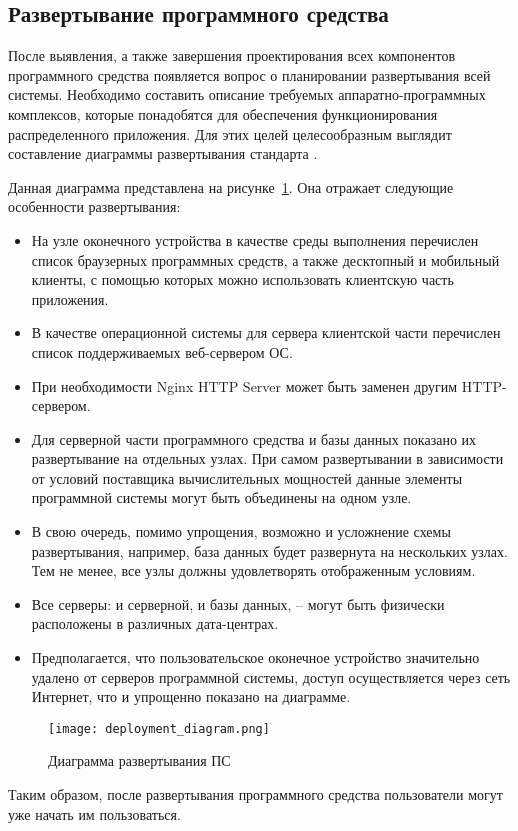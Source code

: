 \subsection{Развертывание программного средства}
\label{sec:design:deployment}

После выявления, а также завершения проектирования всех компонентов программного средства появляется вопрос о планировании развертывания всей системы. Необходимо составить описание требуемых аппаратно-программных комплексов, которые понадобятся для обеспечения функционирования распределенного приложения. Для этих целей целесообразным выглядит составление диаграммы развертывания стандарта \uml. 

Данная диаграмма представлена на рисунке~\ref{fig:design:deployment:diagram}. Она отражает следующие особенности развертывания:

\begin{itemize}
	\item На узле оконечного устройства в качестве среды выполнения перечислен список браузерных программных средств, а также десктопный и мобильный клиенты, с помощью которых можно использовать клиентскую часть приложения.
	\item В качестве операционной системы для сервера клиентской части перечислен список поддерживаемых веб-сервером ОС.
	\item При необходимости Nginx HTTP Server может быть заменен другим HTTP-сервером.
	\item Для серверной части программного средства и базы данных показано их развертывание на отдельных узлах. При самом развертывании в зависимости от условий поставщика вычислительных мощностей данные элементы программной системы могут быть объединены на одном узле.
	\item В свою очередь, помимо упрощения, возможно и усложнение схемы развертывания, например, база данных будет развернута на нескольких узлах. Тем не менее, все узлы должны удовлетворять отображенным условиям.
	\item Все серверы:  и серверной, и базы данных, -- могут быть физически расположены в различных дата-центрах.
	\item Предполагается, что пользовательское оконечное устройство зна\-чи\-те\-льно удалено от серверов программной системы, доступ осуществляется через сеть Интернет, что и упрощенно показано на диаграмме.
\end{itemize}

\begin{figure}[!ht]
\centering
	\texttt{[image: deployment\_diagram.png]}
	\caption{Диаграмма развертывания ПС}
	\label{fig:design:deployment:diagram}
\end{figure}

Таким образом, после развертывания программного средства пользователи могут уже начать им пользоваться.

